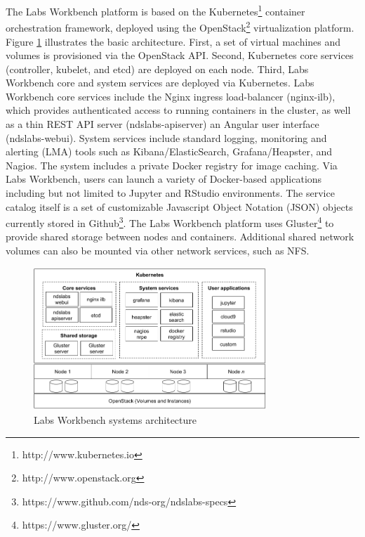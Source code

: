 \documentclass{sig-alternate}
\begin{document}
The Labs Workbench platform is based on the Kubernetes\footnote{http://www.kubernetes.io} container orchestration framework, deployed using the OpenStack\footnote{http://www.openstack.org} virtualization platform. Figure \ref{fig.arch} illustrates the basic architecture. First, a set of virtual machines and volumes is provisioned via the OpenStack API. Second, Kubernetes core services (controller, kubelet, and etcd) are deployed on each node. Third, Labs Workbench core and system services are deployed via Kubernetes. Labs Workbench core services include the Nginx ingress load-balancer (nginx-ilb), which provides authenticated access to running containers in the cluster, as well as a thin REST API server (ndslabs-apiserver) an Angular user interface (ndslabs-webui). System services include standard logging, monitoring and alerting (LMA) tools such as Kibana/ElasticSearch, Grafana/Heapster, and Nagios.  The system includes a private Docker registry for image caching.  Via Labs Workbench, users can launch a variety of Docker-based applications including but not limited to Jupyter and RStudio environments. The service catalog itself is a set of customizable Javascript Object Notation (JSON) objects currently stored in Github\footnote{https://www.github.com/nds-org/ndslabs-specs}. The Labs Workbench platform uses Gluster\footnote{https://www.gluster.org/} to provide shared storage between nodes and containers. Additional shared network volumes can also be mounted via other network services, such as NFS.

\begin{figure}[!ht]
\includegraphics[width=8.75cm]{architecture.png}
\caption{Labs Workbench systems architecture}
\label{fig.arch}
\end{figure}
\end{document}
